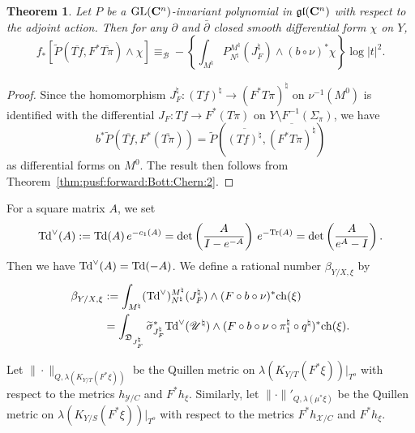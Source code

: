 \documentclass[amscd, leqno]{amsart}
\theoremstyle{plain}
\newtheorem{theorem}{Theorem}[section]
\theoremstyle{definition}
\theoremstyle{remark}
\newenvironment{pf}{\begin{proof}}{\end{proof}}
\begin{document}
\begin{theorem}
\label{thm:singularity:BottChern}
Let $P$ be a ${\rm GL}({\mathbf C}^{n})$-invariant polynomial in $\frak{gl}({\mathbf C}^{n})$ with respect to the adjoint action. 
Then for any $\partial$ and $\bar{\partial}$ closed smooth differential form $\chi$ on $Y$, 
$$
f_{*}\left[ \widetilde{P}( \overline{Tf}, F^{*}\overline{T\pi} ) \wedge \chi \right] 
\equiv_{\mathcal B}
- \left\{ \int_{M^{\natural}} P^{M^{\natural}}_{N^{\natural}}( J_{F}^{\natural} ) \wedge (b \circ \nu)^{*}\chi \right\} \log | t |^{2}.
$$
\end{theorem}

\begin{pf}
Since the homomorphism $J_{F}^{\natural} \colon (Tf)^{\natural} \to (F^{*}T\pi)^{\natural}$ on $\nu^{-1}(M^{0})$ is identified with 
the differential $J_{F} \colon Tf \to F^{*}(T\pi)$ on $Y \setminus F^{-1}(\Sigma_{\pi})$, we have
$$
b^{*}\widetilde{P}(\overline{Tf}, F^{*}(\overline{T\pi})) = \widetilde{P}(\overline{(Tf)^{\natural}}, \overline{(F^{*}T\pi)^{\natural}})
$$
as differential forms on $M^{0}$. The result then follows from Theorem~\ref{thm:pusf:forward:Bott:Chern:2}.
\end{pf}


\par
For a square matrix $A$, we set
$$
{\rm Td}^{\lor}(A) := {\rm Td}(A)\,e^{-c_{1}(A)} = \det\left(\frac{A}{I-e^{-A}}\right)\,e^{-{\rm Tr}(A)} = \det\left(\frac{A}{e^{A}-I}\right).
$$
Then we have ${\rm Td}^{\lor}(A) = {\rm Td}(-A)$. We define a rational number $\beta_{Y/X, \xi}$ by
\begin{equation}
\label{eqn:def:beta}
\begin{aligned}
\beta_{Y/X, \xi}
&:=
\int_{M^{\natural}} ({\rm Td}^{\lor})^{M^{\natural}}_{N^{\natural}}( J_{F}^{\natural} ) 
\wedge (F \circ b \circ \nu)^{*}{\rm ch}( \xi )
\\
&=
\int_{{\mathfrak D}_{J_{F}^{\natural}}}
\widetilde{\sigma}_{J_{F}^{\natural}}^{*}{\rm Td}^{\lor}({\mathscr U}^{\natural}) \wedge 
(F \circ b \circ \nu \circ {\pi}_{1}^{\natural} \circ {q}^{\natural})^{*} {\rm ch}( \xi ).
\end{aligned}
\end{equation}
\par
Let $\|\cdot\|_{Q,\lambda( K_{Y/T}(F^{*}\xi ))}$ be the Quillen metric on $\lambda( K_{Y/T}(F^{*}\xi ))|_{T^{o}}$ with respect to 
the metrics $h_{{\mathcal Y}/C}$ and $F^{*}h_{\xi}$. 
Similarly, let  $\|\cdot\|'_{Q,\lambda( \mu^{*}\xi )}$ be the Quillen metric on $\lambda(K_{Y/S}(F^{*}\xi))|_{T^{o}}$ with respect to 
the metrics $F^{*}h_{{\mathcal X}/C}$ and $F^{*}h_{\xi}$.
\end{document}
